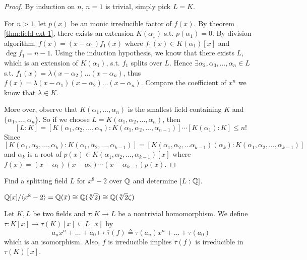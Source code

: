 \begin{proof}
  By induction on $n$, $n = 1$ is trivial, simply pick $L = K$.

  For $n > 1$, let $p(x)$ be an monic irreducible factor of $f(x)$.
  By theorem \ref{thm:field-ext-1}, there exists an extension $K(\alpha_1)$ s.t. $p(\alpha_1) = 0$.
  By division algorithm, $f(x) = (x - \alpha_1) f_1(x)$ where $f_1(x) \in K(\alpha_1)[x]$
  and $\deg f_1 = n - 1$. Using the induction hypothesis, we know that there exists $L$,
  which is an extension of $K(\alpha_1)$, s.t. $f_1$
  splits over $L$. Hence $\exists \alpha_2, \alpha_3, \dots, \alpha_n \in L$ s.t.
  $ f_1(x) = \lambda (x - \alpha_2) \dots (x - \alpha_n)$,
  thus $f(x) = \lambda (x - \alpha_1) (x - \alpha_2) \dots (x - \alpha_n)$. Compare the
  coefficient of $x^n$ we know that $\lambda \in K$.

  More over, observe that $K(\alpha_1, \dots, \alpha_n)$ is the smallest field containing $K$ and
  $\{ \alpha_1, \dots, \alpha_n\}$. So if we choose $L = K(\alpha_1, \alpha_2, \dots, \alpha_n)$,
  then
  \[ [L: K] = [K(\alpha_1, \alpha_2, \dots, \alpha_n): K(\alpha_1, \alpha_2, \dots, \alpha_{n-1})]
    \dotsm
    [K(\alpha_1): K] \leq n! \]
  Since $[K(\alpha_1, \alpha_2, \dots, \alpha_k): K(\alpha_1, \alpha_2, \dots, \alpha_{k-1})]
  = [K(\alpha_1, \alpha_2, \dots \alpha_{k-1})(\alpha_k): K(\alpha_1, \alpha_2, \dots, \alpha_{k-1})]$
  and $\alpha_k$ is a root of $p(x) \in K(\alpha_1, \alpha_2, \dots, \alpha_{k-1})[x]$
  where $f(x) = (x - \alpha_1)(x - \alpha_2) \dotsm (x - \alpha_{k-1}) p(x)$.
\end{proof}

\begin{example}
  Find a splitting field $L$ for $x^8 - 2$ over $\mathbb{Q}$ and determine $[L : \mathbb{Q}]$.
\end{example}

\begin{remark}
  ${\mathbb{Q}[x]}/{\langle x^8 - 2\rangle} = \mathbb{Q}(\bar{x}) \cong \mathbb{Q}(\sqrt[8]{2})
  \cong \mathbb{Q}(\sqrt[8]{2} \zeta)$
\end{remark}

\begin{prop} \label{prop:after-homo-still-irr}
  Let $K, L$ be two fields and $\tau: K \to L$ be a nontrivial homomorphism.
  We define $\bar\tau : K[x] \to \tau(K)[x] \subseteq L[x]$ by
  \[ a_n x^n + \dots + a_0 \mapsto \bar\tau(f) \triangleq \tau(a_n)x^n + \dots + \tau(a_0) \]
  which is an isomorphism. Also, $f$ is irreducible implies $\bar\tau(f)$ is irreducible in $\tau(K)[x]$.
\end{prop}

